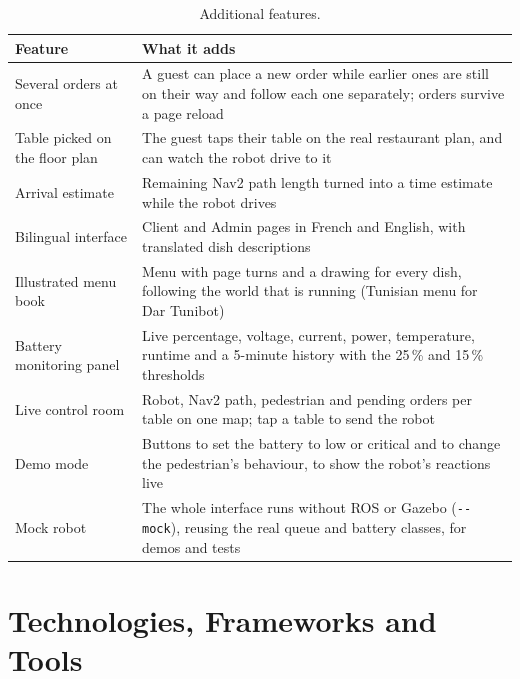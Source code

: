 \documentclass[11pt,a4paper]{article}
\begin{document}
\begin{table}[H]
\centering
\small
\begin{tabularx}{\linewidth}{l L}
\toprule
\textbf{Feature} & \textbf{What it adds} \\
\midrule
Several orders at once & A guest can place a new order while earlier ones are still on their way and follow each one separately; orders survive a page reload \\
Table picked on the floor plan & The guest taps their table on the real restaurant plan, and can watch the robot drive to it \\
Arrival estimate & Remaining Nav2 path length turned into a time estimate while the robot drives \\
Bilingual interface & Client and Admin pages in French and English, with translated dish descriptions \\
Illustrated menu book & Menu with page turns and a drawing for every dish, following the world that is running (Tunisian menu for Dar Tunibot) \\
Battery monitoring panel & Live percentage, voltage, current, power, temperature, runtime and a 5-minute history with the 25\,\% and 15\,\% thresholds \\
Live control room & Robot, Nav2 path, pedestrian and pending orders per table on one map; tap a table to send the robot \\
Demo mode & Buttons to set the battery to low or critical and to change the pedestrian's behaviour, to show the robot's reactions live \\
Mock robot & The whole interface runs without ROS or Gazebo (\texttt{-{}-mock}), reusing the real queue and battery classes, for demos and tests \\
\bottomrule
\end{tabularx}
\caption{Additional features.}
\end{table}

\section{Technologies, Frameworks and Tools}
\end{document}
